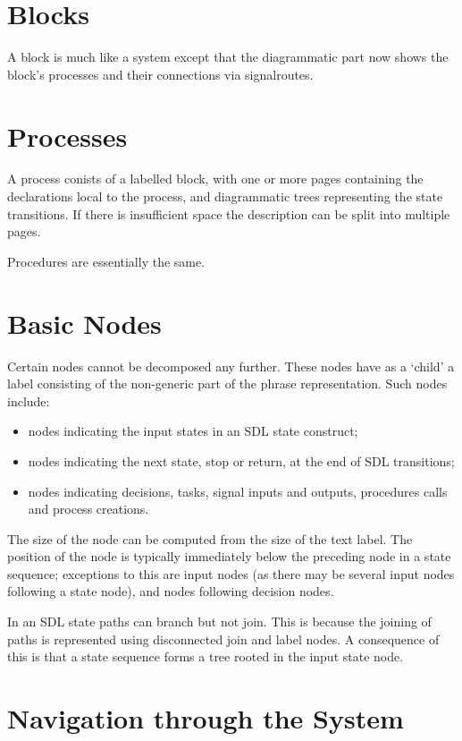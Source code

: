 \section{Blocks}

A block is much like a system except that the diagrammatic part now
shows the block's processes and their connections via signalroutes.

\section{Processes}

A process conists of a labelled block, with one or more pages
containing the declarations local to the process, and diagrammatic
trees representing the state transitions. If there is insufficient
space the description can be split into multiple pages.

Procedures are essentially the same.

\section{Basic Nodes}

Certain nodes cannot be decomposed any further. These nodes have as
a `child' a label consisting of the non-generic part of the phrase
representation. Such nodes include:

\begin{itemize}
\item nodes indicating the input states in an SDL state construct;
\item nodes indicating the next state, stop or return, at the end
of SDL transitions;
\item nodes indicating decisions, tasks, signal inputs and outputs,
procedures calls and process creations.
\end{itemize}

The size of the node can be computed from the size of the text label.
The position of the node is typically immediately below the preceding
node in a state sequence; exceptions to this are input nodes (as
there may be several input nodes following a state node), and nodes
following decision nodes.

In an SDL state paths can branch but not join. This is because the
joining of paths is represented using disconnected join and label 
nodes. A consequence of this is that a state sequence forms a tree
rooted in the input state node.

\section{Navigation through the System}


